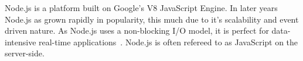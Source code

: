 Node.js is a platform built on Google's V8 JavaScript Engine. In later years Node.js as grown rapidly in popularity, this much due to it's scalability and event driven nature. As Node.js uses a non-blocking I/O model, it is perfect for data-intensive real-time applications~\cite{site:nodejs}. Node.js is often refereed to as JavaScript on the server-side.